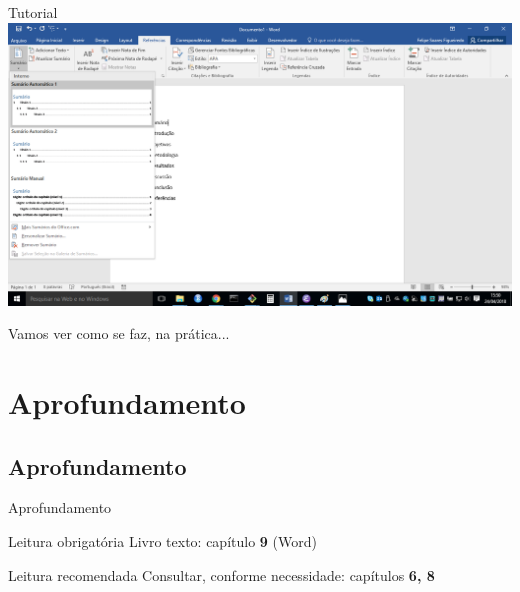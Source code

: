 \documentclass{beamer}
\begin{document}
\begin{frame}{\scriptsize Tutorial}
  \includegraphics[height=0.9\textheight]{EstruturaII/sumario2}
\end{frame}

\begin{frame}{\scriptsize }
  \begin{block}{}
    \Large
    Vamos ver como se faz, na prática...
  \end{block}
\end{frame}

\section{Aprofundamento}

\subsection{Aprofundamento}

\begin{frame}{Aprofundamento}
  \begin{block}{Leitura obrigatória}
    Livro texto: capítulo {\bf 9} (Word)
  \end{block}
  \begin{block}{Leitura recomendada}
    \footnotesize
    Consultar, conforme necessidade: capítulos {\bf 6, 8}
  \end{block}
\end{frame}


\end{document}
